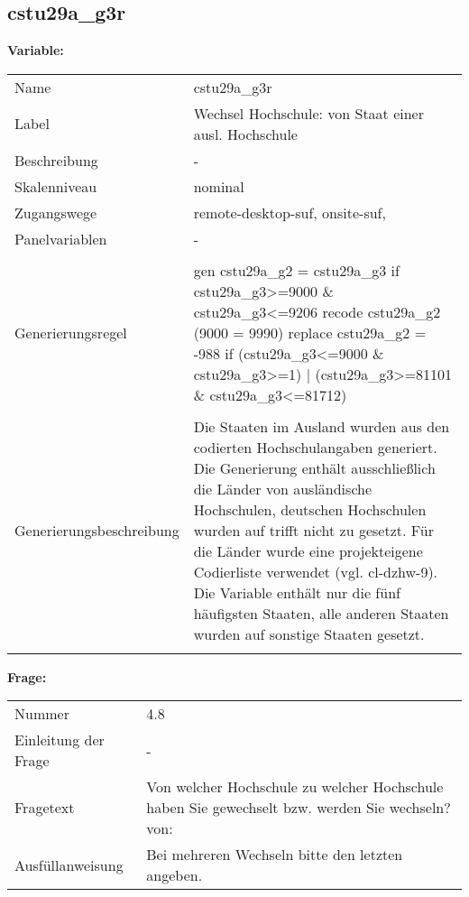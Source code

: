 	
	
	\subsection{cstu29a\_g3r}
	\label{subSection:cstu29a_g3r}

	\noindent\textbf{Variable:}\\
		\begin{tabular}{lL{11.3cm}}
			\label{tableVariable:cstu29a_g3r}
			Name & cstu29a\_g3r \\
			Label & Wechsel Hochschule: von Staat einer ausl. Hochschule \\
			Beschreibung & - \\
			Skalenniveau & nominal \\
			Zugangswege &
				remote-desktop-suf,
				onsite-suf,
 \\
			Panelvariablen & -
			 \\
			 \\
					Generierungsregel & gen cstu29a\_g2 = cstu29a\_g3 if cstu29a\_g3\textgreater{}=9000 \& cstu29a\_g3\textless{}=9206
recode cstu29a\_g2 (9000 = 9990)
replace cstu29a\_g2 = -988 if (cstu29a\_g3\textless{}=9000 \& cstu29a\_g3\textgreater{}=1) | (cstu29a\_g3\textgreater{}=81101 \& cstu29a\_g3\textless{}=81712) \\
				 \\
					Generierungsbeschreibung & Die Staaten im Ausland wurden aus den codierten Hochschulangaben generiert. Die Generierung enthält ausschließlich die Länder von ausländische Hochschulen, deutschen Hochschulen wurden auf trifft nicht zu gesetzt. Für die Länder wurde eine projekteigene Codierliste verwendet (vgl. cl-dzhw-9). Die Variable enthält nur die fünf häufigsten Staaten, alle anderen Staaten wurden auf sonstige Staaten gesetzt. 
				 \\	
			 \\
		\end{tabular}

		\vspace*{1 cm}
		\noindent\textbf{Frage:}\\
		\begin{tabular}{lL{11.3cm}}
			\label{tableQuestion:cstu29a_g3r}
			Nummer & 4.8 \\
			Einleitung der Frage & - \\
			Fragetext & Von welcher Hochschule zu welcher Hochschule haben Sie gewechselt bzw. werden Sie wechseln?
von: \\
			Ausfüllanweisung & Bei mehreren Wechseln bitte den letzten angeben. \\
		\end{tabular}





